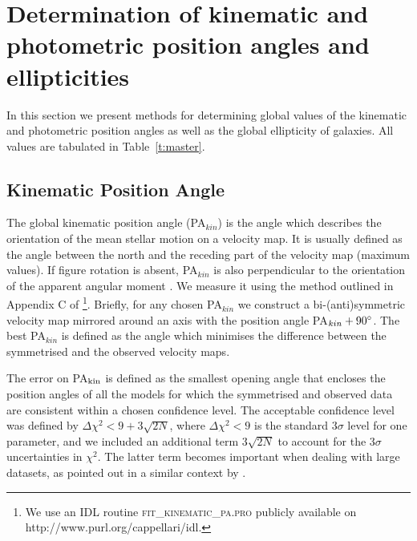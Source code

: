 \documentclass[usenatbib,usegraphicx]{mn2e}
\begin{document}
%
%
\section{Determination of kinematic and photometric position angles and ellipticities}
\label{s:detr}

In this section we present methods for determining global values of the kinematic and photometric position angles as well as the global ellipticity of galaxies.  All values are tabulated in Table~\ref{t:master}.

\subsection{Kinematic Position Angle}
\label{ss:kinPA}

The global kinematic position angle (PA$_{kin}$) is the angle which describes the orientation of the mean stellar motion on a velocity map. It is usually defined as the angle between the north and the receding part of the velocity map (maximum values). If figure rotation is absent, PA$_{kin}$ is also perpendicular to the orientation of the apparent angular moment \citet{1988FranxThesis}. We measure it using the method outlined in Appendix C of \citet{2006MNRAS.366..787K}\footnote{We use an IDL routine  \textsc{fit\_kinematic\_pa.pro} publicly available on http://www.purl.org/cappellari/idl.}. Briefly, for any chosen PA$_{kin}$ we construct a bi-(anti)symmetric velocity map mirrored around an axis with the position angle PA$_{kin}+90\hbox{$^\circ$}$. The best PA$_{kin}$ is defined as the angle which minimises the difference between the symmetrised and the observed velocity maps. 

The error on PA$_{\rm kin}$ is defined as the smallest opening angle that encloses the position angles of all the models for which the symmetrised and observed data are consistent within a chosen confidence level. The acceptable confidence level was defined by $\Delta\chi^2<9+3\sqrt{2N}$, where $\Delta\chi^2<9$ is the standard $3\sigma$ level for one parameter, and we included an additional term $3\sqrt{2N}$ to account for the $3\sigma$ uncertainties in $\chi^2$. The latter term becomes important when dealing with large datasets, as pointed out in a similar context by \citet{2009MNRAS.398.1117V}.
\end{document}
